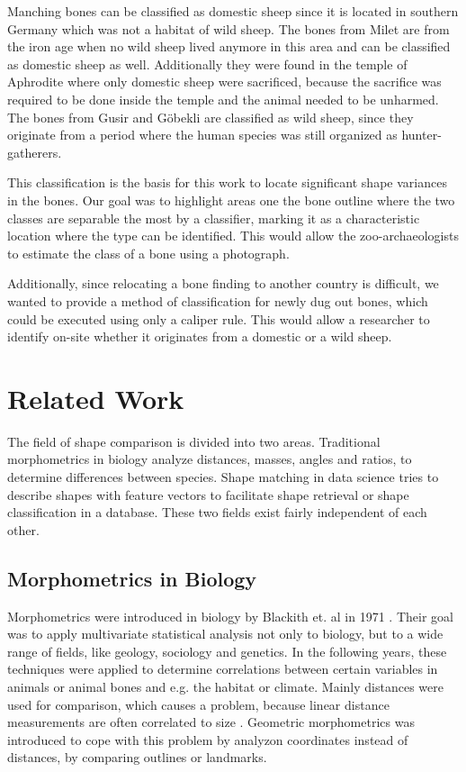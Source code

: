 \documentclass[pdftex,12pt,a4paper]{report}
\begin{document}
Manching bones can be classified as domestic sheep since it is located in southern Germany which was not a habitat of wild sheep. The bones from Milet are from the iron age when no wild sheep lived anymore in this area and can be classified as domestic sheep as well. Additionally they were found in the temple of Aphrodite where only domestic sheep were sacrificed, because the sacrifice was required to be done inside the temple and the animal needed to be unharmed. The bones from Gusir and Göbekli are classified as wild sheep, since they originate from a period where the human species was still organized as hunter-gatherers.

This classification is the basis for this work to locate significant shape variances in the bones. Our goal was to highlight areas one the bone outline where the two classes are separable the most by a classifier, marking it as a characteristic location where the type can be identified. This would allow the zoo-archaeologists to estimate the class of a bone using a photograph.

Additionally, since relocating a bone finding to another country is difficult, we wanted to provide a method of classification for newly dug out bones, which could be executed using only a caliper rule. This would allow a researcher to identify on-site whether it originates from a domestic or a wild sheep. 

\chapter{Related Work}

The field of shape comparison is divided into two areas. Traditional morphometrics in biology analyze distances, masses, angles and ratios, to determine differences between species. Shape matching in data science tries to describe shapes with feature vectors to facilitate shape retrieval or shape classification in a database. These two fields exist fairly independent of each other.

\section{Morphometrics in Biology}

Morphometrics were introduced in biology by Blackith et. al in 1971 \cite{blackith1971multivariate}. Their goal was to apply multivariate statistical analysis not only to biology, but to a wide range of fields, like geology, sociology and genetics. In the following years, these techniques were applied to determine correlations between certain variables in animals or animal bones and e.g. the habitat or climate. Mainly distances were used for comparison, which causes a problem, because linear distance measurements are often correlated to size \cite{bookstein1985morphometrics}. Geometric morphometrics was introduced to cope with this problem by analyzon coordinates instead of distances, by comparing outlines or landmarks.
\end{document}
